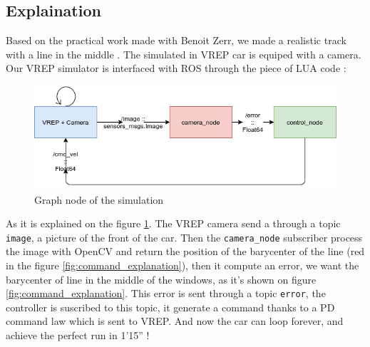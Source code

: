 \subsection{Explaination}

Based on the practical work made with Benoit Zerr, we made a realistic track with a line in the middle \cite{zerr}.
The simulated in VREP car is equiped with a camera. Our VREP simulator is interfaced with ROS through the piece of LUA code :

\begin{figure}[ht!]
    \begin{center}
        \includegraphics[scale=0.5]{Images/graph_node_simulation.png}
    \end{center}
    \caption{Graph node of the simulation}
    \label{fig:graph_node_simulation}

\end{figure}

As it is explained on the figure \ref{fig:graph_node_simulation}. The VREP camera send a through a topic \texttt{image}, a picture of the front of the car. 
Then the \texttt{camera\_node} subscriber process the image with OpenCV and return the position
of the barycenter of the line (red in the figure \ref{fig:command_explanation}), then it compute an error, we want the barycenter of line in the middle of the windows, as it's shown on figure \ref{fig:command_explanation}. 
This error is sent through a topic \texttt{error}, the controller is suscribed to this topic,
it generate a command thanks to a PD command law which is sent to VREP. And now the car can loop forever, and achieve 
the perfect run in 1'15'' !

